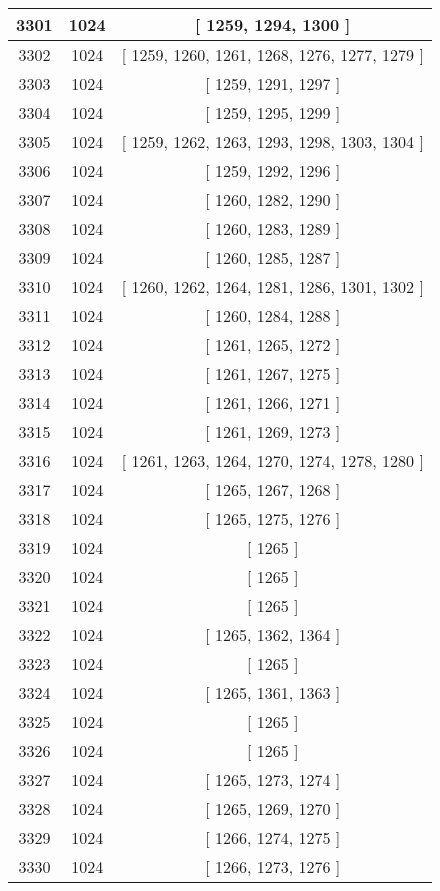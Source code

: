 \begin{center}
\begin{longtable}[H]{|| c c c ||}
\hline
3301 & 1024 & [ 1259, 1294, 1300 ] \\ 
\hline
3302 & 1024 & [ 1259, 1260, 1261, 1268, 1276, 1277, 1279 ] \\ 
\hline
3303 & 1024 & [ 1259, 1291, 1297 ] \\ 
\hline
3304 & 1024 & [ 1259, 1295, 1299 ] \\ 
\hline
3305 & 1024 & [ 1259, 1262, 1263, 1293, 1298, 1303, 1304 ] \\ 
\hline
3306 & 1024 & [ 1259, 1292, 1296 ] \\ 
\hline
3307 & 1024 & [ 1260, 1282, 1290 ] \\ 
\hline
3308 & 1024 & [ 1260, 1283, 1289 ] \\ 
\hline
3309 & 1024 & [ 1260, 1285, 1287 ] \\ 
\hline
3310 & 1024 & [ 1260, 1262, 1264, 1281, 1286, 1301, 1302 ] \\ 
\hline
3311 & 1024 & [ 1260, 1284, 1288 ] \\ 
\hline
3312 & 1024 & [ 1261, 1265, 1272 ] \\ 
\hline
3313 & 1024 & [ 1261, 1267, 1275 ] \\ 
\hline
3314 & 1024 & [ 1261, 1266, 1271 ] \\ 
\hline
3315 & 1024 & [ 1261, 1269, 1273 ] \\ 
\hline
3316 & 1024 & [ 1261, 1263, 1264, 1270, 1274, 1278, 1280 ] \\ 
\hline
3317 & 1024 & [ 1265, 1267, 1268 ] \\ 
\hline
3318 & 1024 & [ 1265, 1275, 1276 ] \\ 
\hline
3319 & 1024 & [ 1265 ] \\ 
\hline
3320 & 1024 & [ 1265 ] \\ 
\hline
3321 & 1024 & [ 1265 ] \\ 
\hline
3322 & 1024 & [ 1265, 1362, 1364 ] \\ 
\hline
3323 & 1024 & [ 1265 ] \\ 
\hline
3324 & 1024 & [ 1265, 1361, 1363 ] \\ 
\hline
3325 & 1024 & [ 1265 ] \\ 
\hline
3326 & 1024 & [ 1265 ] \\ 
\hline
3327 & 1024 & [ 1265, 1273, 1274 ] \\ 
\hline
3328 & 1024 & [ 1265, 1269, 1270 ] \\ 
\hline
3329 & 1024 & [ 1266, 1274, 1275 ] \\ 
\hline
3330 & 1024 & [ 1266, 1273, 1276 ] \\ 

\end{longtable}
\end{center}

